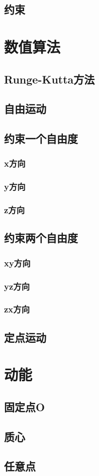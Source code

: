 \subsection{约束}

\section{数值算法}
\subsection{Runge-Kutta方法}
\subsection{自由运动}
\subsection{约束一个自由度}
\subsubsection*{x方向}
\subsubsection*{y方向}
\subsubsection*{z方向}
\subsection{约束两个自由度}
\subsubsection*{xy方向}
\subsubsection*{yz方向}
\subsubsection*{zx方向}
\subsection{定点运动}

\section{动能}

\subsection{固定点O}
\subsection{质心}
\subsection{任意点}

